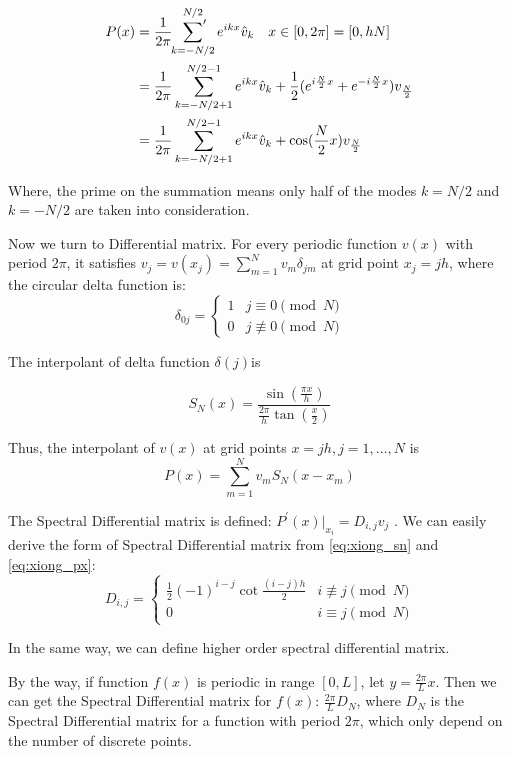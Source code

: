 \begin{align}
\label{eq:xiong_interp}
 P(x)&=\frac{1}{2\pi}\sideset{}{'}\sum_{k=-N/2}^{N/2}e^{ikx}\hat{v}_{k} \quad
 x\in [0,2\pi]=[0,hN]  \\
 &=\frac{1}{2\pi}\sum_{k=-N/2+1}^{N/2-1}e^{ikx}\hat{v}_{k}+\frac{1}{2}
 (e^{i\frac{N}{2}x}+e^{-i\frac{N}{2}x})v_{\frac{N}{2}} \nonumber\\
 &=\frac{1}{2\pi}\sum_{k=-N/2+1}^{N/2-1}e^{ikx}\hat{v}_{k}+
 \cos(\frac{N}{2}x)v_{\frac{N}{2}} \nonumber
\end{align}

Where, the prime on the summation means only half of the modes
$k=N/2$ and $k=-N/2$ are taken into consideration.

Now we turn to Differential matrix. For every periodic function $v(x)$
with period $2\pi$, it satisfies
$v_{j}=v(x_{j})=\sum_{m=1}^{N}v_{m}\delta_{jm}$ at
 grid point $x_{j}=jh$, where the circular delta function is:
 \[
 \delta_{0j} =
  \begin{cases}
   1 & j\equiv 0 \pmod N \\
   0 & j\not\equiv 0 \pmod N
  \end{cases}
\]

The interpolant of delta function $\delta (j)$is

\begin{equation}
\label{eq:xiong_sn}
 S_{N}(x)=\frac{\sin (\frac{\pi x}{h})}{\frac{2\pi}{h}\tan (\frac{x}{2})}
\end{equation}

Thus, the interpolant of $v(x)$ at grid points ${x=jh,j=1,\dots ,N}$ is
\begin{equation}
\label{eq:xiong_px}
 P(x)=\sum_{m=1}^{N}v_{m}S_{N}(x-x_{m})
\end{equation}

The Spectral Differential matrix is defined:
$P^{'}(x)|_{x_{i}}=D_{i,j}v_{j}$ .
We can easily derive the form of Spectral Differential matrix from
\eqref{eq:xiong_sn} and \eqref{eq:xiong_px}:
\[
 D_{i,j}=
	 \begin{cases}
          \frac{1}{2}(-1)^{i-j}\cot \frac{(i-j)h}{2} & i\not\equiv j \pmod N  \\
          0 & i\equiv j \pmod N
         \end{cases}
\]


In the same way, we can define higher order spectral differential matrix.

By the way, if function $f(x)$ is periodic in range $[0,L]$, let $y=\frac{2\pi}{L}x$.
Then we can get the Spectral Differential matrix for $f(x)$: $\frac{2\pi}{L}D_{N}$,
where $D_{N}$ is the Spectral Differential matrix for a function with period $2\pi$,
which only depend on the number of discrete points.

